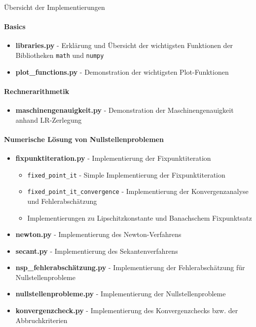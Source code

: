 \begin{KR}{Übersicht der Implementierungen}
\paragraph{Basics}
\begin{itemize}
    \item \textbf{libraries.py} - Erklärung und Übersicht der wichtigsten Funktionen der Bibliotheken \texttt{math} und \texttt{numpy}
    \item \textbf{plot_functions.py} - Demonstration der wichtigsten Plot-Funktionen
\end{itemize}

\paragraph{Rechnerarithmetik}
\begin{itemize}
    \item \textbf{maschinengenauigkeit.py} - Demonstration der Maschinengenauigkeit anhand LR-Zerlegung
\end{itemize}

\paragraph{Numerische Lösung von Nullstellenproblemen}
\begin{itemize}
    \item \textbf{fixpunktiteration.py} - Implementierung der Fixpunktiteration
    \begin{itemize}
        \item \texttt{fixed_point_it} - Simple Implementierung der Fixpunktiteration
        \item \texttt{fixed_point_it_convergence} - Implementierung der Konvergenzanalyse und Fehlerabschätzung
        \item Implementierungen zu Lipschitzkonstante und Banachschem Fixpunktsatz
    \end{itemize}
    \item \textbf{newton.py} - Implementierung des Newton-Verfahrens
    \item \textbf{secant.py} - Implementierung des Sekantenverfahrens
    \item \textbf{nsp_fehlerabschätzung.py} - Implementierung der Fehlerabschätzung für Nullstellenprobleme
    \item \textbf{nullstellenprobleme.py} - Implementierung der Nullstellenprobleme
    \item \textbf{konvergenzcheck.py} - Implementierung des Konvergenzchecks bzw. der Abbruchkriterien
\end{itemize}


\end{KR}
